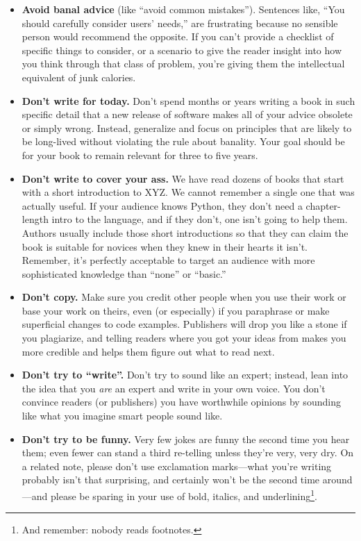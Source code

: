 \documentclass[10pt,letterpaper]{article}
\begin{document}
\begin{itemize}
\item
  \textbf{Avoid banal advice} (like ``avoid common mistakes'').
  Sentences like, ``You should carefully consider users' needs,'' are
  frustrating because no sensible person would recommend the opposite.
  If you can't provide a checklist of specific things to
  consider, or a scenario to give the reader insight into how you think
  through that class of problem, you're giving them the intellectual
  equivalent of junk calories.
\item
  \textbf{Don't write for today.} Don't spend months or years
  writing a book in such specific detail that a new release of software
  makes all of your advice obsolete or simply wrong. Instead, generalize
  and focus on principles that are likely to be long-lived without
  violating the rule about banality. Your goal should be for your book
  to remain relevant for three to five years.
\item
  \textbf{Don't write to cover your ass.} We have read dozens of books
  that start with a short introduction to XYZ. We cannot remember a
  single one that was actually useful. If your audience knows Python,
  they don't need a chapter-length intro to the language, and if they
  don't, one isn't going to help them. Authors usually include those
  short introductions so that they can claim the book is suitable for
  novices when they knew in their hearts it isn't. Remember, it's
  perfectly acceptable to target an audience with more sophisticated
  knowledge than ``none'' or ``basic.''
\item
  \textbf{Don't copy.} Make sure you credit other people when
  you use their work or base your work on theirs, even (or especially)
  if you paraphrase or make superficial changes to code examples.
  Publishers will drop you like a stone if you plagiarize, and telling
  readers where you got your ideas from makes you more credible and
  helps them figure out what to read next.
\item
  \textbf{Don't try to ``write''.} Don't try to sound like an
  expert; instead, lean into the idea that you \emph{are} an expert and
  write in your own voice. You don't convince readers (or publishers)
  you have worthwhile opinions by sounding like what you imagine smart
  people sound like.
\item
  \textbf{Don't try to be funny.} Very few jokes are funny the second
  time you hear them; even fewer can stand a third re-telling unless
  they're very, very dry. On a related note, please don't use
  exclamation marks---what you're writing probably isn't that
  surprising, and certainly won't be the second time around---and
  please be sparing in your use of bold, italics, and
  underlining\footnote{And remember: nobody reads footnotes.}.
\end{itemize}
\end{document}
